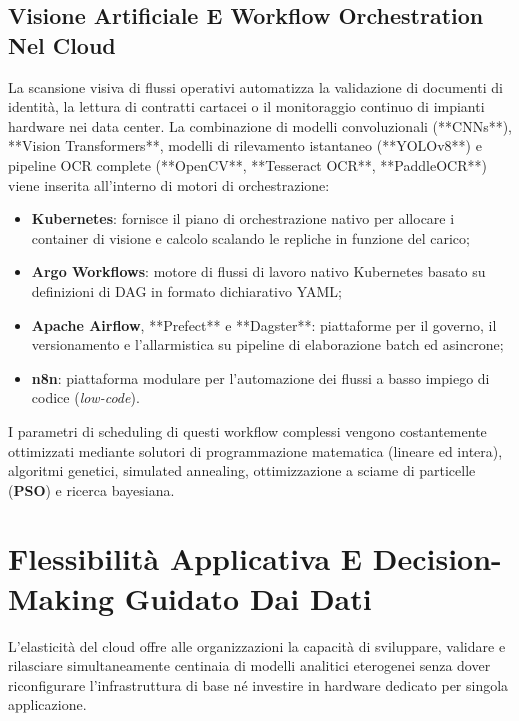 \documentclass[11pt, a4paper]{article}
\begin{document}
\subsection{Visione Artificiale E Workflow Orchestration Nel Cloud}

La scansione visiva di flussi operativi automatizza la validazione di documenti di identità, la lettura di contratti cartacei o il monitoraggio continuo di impianti hardware nei data center. La combinazione di modelli convoluzionali (**CNNs**), **Vision Transformers**, modelli di rilevamento istantaneo (**YOLOv8**) e pipeline OCR complete (**OpenCV**, **Tesseract OCR**, **PaddleOCR**) viene inserita all'interno di motori di orchestrazione:
\begin{itemize}
    \item \textbf{Kubernetes}: fornisce il piano di orchestrazione nativo per allocare i container di visione e calcolo scalando le repliche in funzione del carico;
    \item \textbf{Argo Workflows}: motore di flussi di lavoro nativo Kubernetes basato su definizioni di DAG in formato dichiarativo YAML;
    \item \textbf{Apache Airflow}, **Prefect** e **Dagster**: piattaforme per il governo, il versionamento e l'allarmistica su pipeline di elaborazione batch ed asincrone;
    \item \textbf{n8n}: piattaforma modulare per l'automazione dei flussi a basso impiego di codice (\emph{low-code}).
\end{itemize}

I parametri di scheduling di questi workflow complessi vengono costantemente ottimizzati mediante solutori di programmazione matematica (lineare ed intera), algoritmi genetici, simulated annealing, ottimizzazione a sciame di particelle (\textbf{PSO}) e ricerca bayesiana.

\newpage

\section{Flessibilità Applicativa E Decision-Making Guidato Dai Dati}

L'elasticità del cloud offre alle organizzazioni la capacità di sviluppare, validare e rilasciare simultaneamente centinaia di modelli analitici eterogenei senza dover riconfigurare l'infrastruttura di base né investire in hardware dedicato per singola applicazione.

\end{document}
